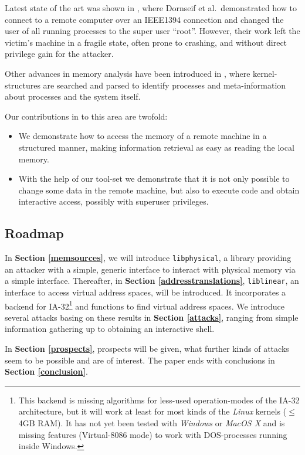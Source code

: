 Latest state of the art was shown in \cite{cansecwest_firewire:2005}, where
Dornseif et al.~demonstrated how to connect to a remote computer over an
IEEE1394 connection and changed the user of all running processes to the super
user "`root"'. However, their work left the victim's machine in a fragile state,
often prone to crashing, and without direct privilege gain for the attacker.

Other advances in memory analysis have been introduced in
\cite{finding_digital_evidence_in_physical_memory:2006}, where kernel-structures
are searched and parsed to identify processes and meta-information about
processes and the system itself.

Our contributions in to this area are twofold: 

\begin{itemize} 

\item We demonstrate how to access the memory of a remote machine in a
structured manner, making information retrieval as easy as reading the local
memory.

\item With the help of our tool-set we demonstrate that it is not only possible
to change some data in the remote machine, but also to execute code and obtain
interactive access, possibly with superuser privileges.

\end{itemize}

\subsection{Roadmap}

In \textbf{Section \ref{memsources}}, we will introduce \texttt{libphysical}, a
library providing an attacker with a simple, generic interface to interact with
physical memory via a simple interface.  Thereafter, in \textbf{Section
\ref{addresstranslations}}, \texttt{liblinear}, an interface to access virtual
address spaces, will be introduced. It incorporates a backend for
IA-32\footnote{This backend is missing algorithms for less-used operation-modes
of the IA-32 architecture, but it will work at least for most kinds of the
\emph{Linux} kernels ($\leq$ 4GB RAM). It has not yet been tested with
\emph{Windows} or \emph{MacOS X} and is missing features (Virtual-8086 mode) to
work with DOS-processes running inside Windows.} and functions to find virtual
address spaces.  We introduce several attacks basing on these results in
\textbf{Section \ref{attacks}}, ranging from simple information gathering up to
obtaining an interactive shell.

In \textbf{Section \ref{prospects}}, prospects will be given, what further kinds
of attacks seem to be possible and are of interest. The paper ends with
conclusions in \textbf{Section \ref{conclusion}}.

